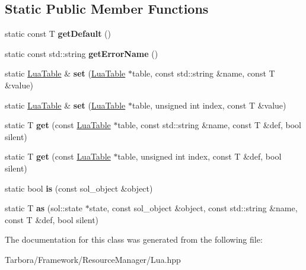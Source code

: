 \subsection*{Static Public Member Functions}
\begin{DoxyCompactItemize}
\item 
\mbox{\label{classTarbora_1_1LuaType_aa5081f9b96de2736200f8b7a1e9545de}} 
static const T {\bfseries get\+Default} ()
\item 
\mbox{\label{classTarbora_1_1LuaType_a33c85d575ec78aaf917696e1a8b4b327}} 
static const std\+::string {\bfseries get\+Error\+Name} ()
\item 
\mbox{\label{classTarbora_1_1LuaType_a61fbffc81a8182973f3024e1738de596}} 
static \hyperlink{classTarbora_1_1LuaTable}{Lua\+Table} \& {\bfseries set} (\hyperlink{classTarbora_1_1LuaTable}{Lua\+Table} $\ast$table, const std\+::string \&name, const T \&value)
\item 
\mbox{\label{classTarbora_1_1LuaType_a1522305eca3d1e5b7c29120bf7fee0de}} 
static \hyperlink{classTarbora_1_1LuaTable}{Lua\+Table} \& {\bfseries set} (\hyperlink{classTarbora_1_1LuaTable}{Lua\+Table} $\ast$table, unsigned int index, const T \&value)
\item 
\mbox{\label{classTarbora_1_1LuaType_aa9ee81c6fa63b2638721c2ed26e8dcdc}} 
static T {\bfseries get} (const \hyperlink{classTarbora_1_1LuaTable}{Lua\+Table} $\ast$table, const std\+::string \&name, const T \&def, bool silent)
\item 
\mbox{\label{classTarbora_1_1LuaType_a7bca4759ba99ad3d32c1c3aacd8160db}} 
static T {\bfseries get} (const \hyperlink{classTarbora_1_1LuaTable}{Lua\+Table} $\ast$table, unsigned int index, const T \&def, bool silent)
\item 
\mbox{\label{classTarbora_1_1LuaType_adfb80d9bdea5bf859e0a25b8f2711fad}} 
static bool {\bfseries is} (const sol\+\_\+object \&object)
\item 
\mbox{\label{classTarbora_1_1LuaType_a971b18d34164ea216daf750a14752007}} 
static T {\bfseries as} (sol\+::state $\ast$state, const sol\+\_\+object \&object, const std\+::string \&name, const T \&def, bool silent)
\end{DoxyCompactItemize}


The documentation for this class was generated from the following file\+:\begin{DoxyCompactItemize}
\item 
Tarbora/\+Framework/\+Resource\+Manager/Lua.\+hpp\end{DoxyCompactItemize}
